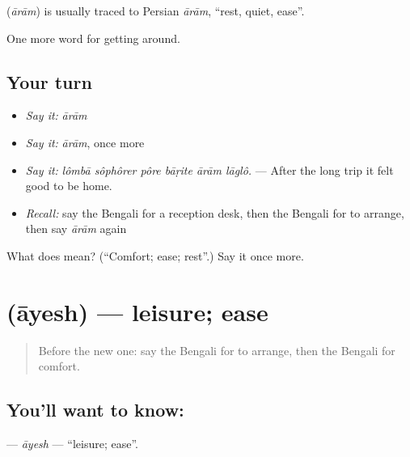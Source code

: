 \begin{cousinweb}
\textbf{} (\emph{ārām}) is usually traced to Persian \emph{ārām}, \textquotedblleft{}rest, quiet, ease\textquotedblright{}.
\end{cousinweb}

\begin{grammarlens}[title={What you've built}]
One more word for getting around.
\end{grammarlens}

\subsection*{Your turn}
\begin{itemize}
\raggedright
  \item \emph{Say it:} \emph{ārām}
  \item \emph{Say it:} \emph{ārām}, once more
  \item \emph{Say it:} \emph{lômbā sôphôrer pôre bāṛite ārām lāglô.} — After the long trip it felt good to be home.
  \item \emph{Recall:} say the Bengali for a reception desk, then the Bengali for to arrange, then say \emph{ārām} again
\end{itemize}

\begin{tcolorbox}[breakable,colback=teal!4,colframe=teal!35!black,title={Before you move on}]
What does  mean? (\textquotedblleft{}Comfort; ease; rest\textquotedblright{}.) Say it once more.
\end{tcolorbox}
\section[\texorpdfstring{\bn{আয়েশ} (āyesh)}{আয়েশ (āyesh)}]{ (āyesh) — leisure; ease}

\label{lesson:BN-C404-ayesh}



\begin{quote}
Before the new one: say the Bengali for to arrange, then the Bengali for comfort.
\end{quote}

\subsection*{You'll want to know: }
\textbf{} — \emph{āyesh} — \textquotedblleft{}leisure; ease\textquotedblright{}.

